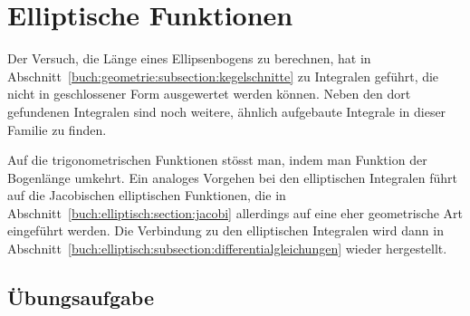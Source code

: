 %
%
%
\chapter{Elliptische Funktionen
\label{buch:chapter:elliptischefunktionen}}
\rhead{}

Der Versuch, die Länge eines Ellipsenbogens zu berechnen, hat
in Abschnitt~\ref{buch:geometrie:subsection:kegelschnitte}
zu Integralen geführt, die nicht in geschlossener Form ausgewertet
werden können.
Neben den dort gefundenen Integralen sind noch weitere, ähnlich
aufgebaute Integrale in dieser Familie zu finden.

Auf die trigonometrischen Funktionen stösst man, indem man Funktion
der Bogenlänge umkehrt.
Ein analoges Vorgehen bei den elliptischen Integralen führt auf
die Jacobischen elliptischen Funktionen, die in
Abschnitt~\ref{buch:elliptisch:section:jacobi} allerdings auf
eine eher geometrische Art eingeführt werden.
Die Verbindung zu den elliptischen Integralen wird dann in
Abschnitt~\ref{buch:elliptisch:subsection:differentialgleichungen}
wieder hergestellt.










\section*{Übungsaufgabe}
\begin{uebungsaufgaben}
\end{uebungsaufgaben}

